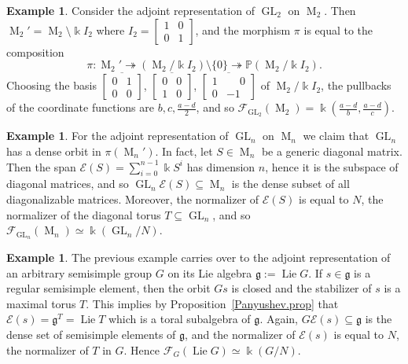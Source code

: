 \documentclass{amsart}
\theoremstyle{definition}
\newtheorem{exa}[thm]{Example}
\theoremstyle{remark}
\begin{document}
\begin{exa}\label{exa2}
Consider the adjoint representation of $\operatorname{GL}_{2}$ on $\operatorname{M}_{2}$. Then $\operatorname{M}_{2}' = \operatorname{M}_{2}\setminus {\Bbbk} I_{2}$ where $I_{2}=\left[\begin{smallmatrix}1&0\\0&1\end{smallmatrix}\right]$, and the morphism $\pi$ is equal to the composition
$$
\pi\colon \operatorname{M}_{2}' {\twoheadrightarrow} (\operatorname{M}_{2}/{\Bbbk} I_{2}) \setminus \{0\} {\twoheadrightarrow} {\mathbb P}(\operatorname{M}_{2}/{\Bbbk} I_{2}).
$$
Choosing the basis 
$\overline{\left[\begin{smallmatrix}0&1\\0&0\end{smallmatrix}\right]}$, 
$\overline{\left[\begin{smallmatrix}0&0\\1&0\end{smallmatrix}\right]}$, 
$\overline{\left[\begin{smallmatrix}1&\phantom{-}0\\0&-1\end{smallmatrix}\right]}$  of $\operatorname{M}_{2}/{\Bbbk} I_{2}$, the pullbacks of the coordinate functions are $b,c,\frac{a-d}{2}$, and so 
${\mathcal F}_{\operatorname{GL}_{2}}(\operatorname{M}_{2}) = {\Bbbk}(\frac{a-d}{b},\frac{a-d}{c})$.
\end{exa}
\begin{exa}
For the adjoint representation of $\operatorname{GL}_{n}$ on $\operatorname{M}_{n}$ we claim that $\operatorname{GL}_{n}$ has a dense orbit in $\pi(\operatorname{M}_{n}')$. In fact, let $S \in \operatorname{M}_{n}$ be a generic diagonal matrix. Then the span ${\mathcal E}(S)=\sum_{i=0}^{n-1}{\Bbbk} S^{i}$ has dimension $n$, hence it is the subspace of diagonal matrices, and so $\operatorname{GL}_{n}{\mathcal E}(S) {\subseteq} \operatorname{M}_{n}$ is the dense subset of all diagonalizable matrices. Moreover,  the normalizer of ${\mathcal E}(S)$ is equal to $N$, the normalizer of the diagonal torus $T {\subseteq} \operatorname{GL}_{n}$, and so ${\mathcal F}_{\operatorname{GL}_{n}}(\operatorname{M}_{n})\simeq {\Bbbk}(\operatorname{GL}_{n}/N)$.
\end{exa}

\begin{exa}
The previous example carries over to the adjoint representation of an arbitrary semisimple group $G$ on its Lie algebra ${\mathfrak g}:=\operatorname{Lie} G$. If $s \in {\mathfrak g}$ is a regular semisimple element, then the orbit $Gs$ is closed and the stabilizer of $s$ is a maximal torus $T$. This implies by Proposition~\ref{Panyushev.prop} that ${\mathcal E}(s) = {\mathfrak g}^{T}=\operatorname{Lie} T$ which is a toral subalgebra of ${\mathfrak g}$. Again, $G {\mathcal E}(s){\subseteq} {\mathfrak g}$ is the dense set of semisimple elements of ${\mathfrak g}$, and the normalizer of ${\mathcal E}(s)$ is equal to $N$, the normalizer of $T$ in $G$. Hence ${\mathcal F}_{G}(\operatorname{Lie} G) \simeq {\Bbbk}(G/N)$.
\end{exa}
\end{document}
